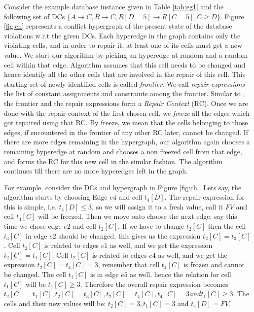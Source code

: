 Consider the example database instance given in Table \ref{tab:eg1} and the following set of DCs $\{ A \rightarrow C, B \rightarrow C, R[D=5] \rightarrow R[C=5], C \geq D \}$.
Figure \ref{fig:ch} represents a conflict hypergraph of the present state of the database violations w.r.t the given DCs.
Each hyperedge in the graph contains only the violating cells, and in order to repair it, at least one of its cells must get a new value.
We start our algorithm by picking an hyperedge at random and a random cell within that edge.
Algorithm assumes that this cell needs to be changed and hence identify all the other cells that are involved in the repair of this cell.
This starting set of newly identified cells is called \textit{frontier}.
We call \textit{repair expressions} the list of constant assignments and constraints among the frontier.
Similar to \cite{XuChu}, the frontier and the repair expressions form a \textit{Repair Context} (RC).
Once we are done with the repair context of the first chosen cell, we \textit{freeze} all the edges which got repaired using that RC.
By freeze, we mean that the cells belonging to those edges, if encountered in the frontier of any other RC later, cannot be changed.
If there are more edges remaining in the hypergraph, our algorithm again chooses a remaining hyperedge at random and chooses a non freezed cell from that edge,
and forms the RC for this new cell in the similar fashion.
The algorithm continues till there are no more hyperedges left in the graph.

For example, consider the DCs and hypergraph in Figure \ref{fig:ch}.
Lets say, the algorithm starts by choosing Edge $e4$ and cell $t_4[D]$.
The repair expression for this is simple, i.e. $t_4[D] \leq 3$, so we will assign it to a fresh value, call it $FV$ and cell $t_4[C]$ will be freezed.
Then we move onto choose the next edge, say this time we chose edge $e2$ and cell $t_2[C]$.
If we have to change $t_2[C]$ then the cell $t_3[C]$ in edge $e2$ should be changed, this gives us the expression $t_2[C] = t_3[C]$.
Cell $t_2[C]$ is related to edges $e1$ as well, and we get the expression $t_2[C] = t_1[C]$.
Cell $t_2[C]$ is related to edges $e4$ as well, and we get the expression $t_2[C] = t_4[C] = 3$, remember that cell $t_4[C]$ is frozen and cannot be changed.
The cell $t_1[C]$ is in edge $e5$ as well, hence the relation for cell $t_1[C]$ will be $t_1[C] \geq 3$.
Therefore the overall repair expression becomes $t_2[C] = t_1[C], t_2[C] = t_3[C], t_2[C] = t_4[C], t_4[C] = 3 and t_1[C] \geq 3$.
The cells and their new values will be: $t_2[C] = 3, t_1[C] = 3$ and $t_4[D] = FV$.

